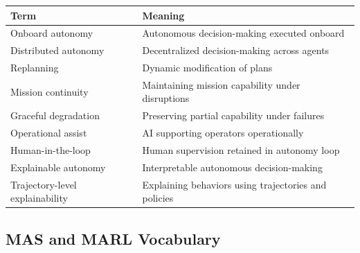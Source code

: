 \documentclass[10pt,a4paper,twocolumn]{article}
\begin{document}
\begin{tabularx}{\columnwidth}{lX}
    \toprule
    Term                            & Meaning                                              \\
    \midrule
    Onboard autonomy                & Autonomous decision-making executed onboard          \\
    Distributed autonomy            & Decentralized decision-making across agents          \\
    Replanning                      & Dynamic modification of plans                        \\
    Mission continuity              & Maintaining mission capability under disruptions     \\
    Graceful degradation            & Preserving partial capability under failures         \\
    Operational assist              & AI supporting operators operationally                \\
    Human-in-the-loop               & Human supervision retained in autonomy loop          \\
    Explainable autonomy            & Interpretable autonomous decision-making             \\
    Trajectory-level explainability & Explaining behaviors using trajectories and policies \\
    \bottomrule
\end{tabularx}


\subsection{MAS and MARL Vocabulary}
\end{document}
